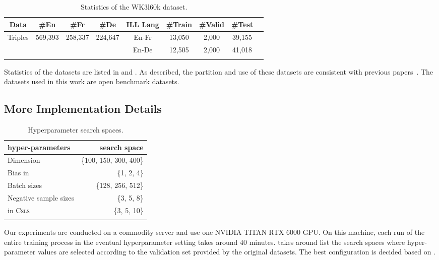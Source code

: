\documentclass[11pt,a4paper]{article}
\def\bhline{\specialrule{.2em}{0em}{0em}}
\begin{document}
{
\begin{table}[h!]
\setlength\tabcolsep{2pt}
\centering
\scriptsize
\begin{tabular}{c|ccc|c|cccc}
\bhline
Data&\#En&\#Fr&\#De&ILL Lang&\#Train&\#Valid&\#Test\\
\hline
\multirow{2}{*}{Triples}&\multirow{2}{*}{569,393}&\multirow{2}{*}{258,337}&\multirow{2}{*}{224,647}&En-Fr&13,050&2,000&39,155\\
&&&&En-De&12,505&2,000&41,018\\
\bhline
\end{tabular}
\caption{Statistics of the WK3l60k dataset.}\label{tbl:statwk}
\end{table}
}


Statistics of the datasets are listed in  and .
As described, the partition and use of these datasets are consistent with previous papers~\cite{chen2018co,sun2017cross,sun2018bootstrapping,wang2018cross,yang2019aligning,pei2019transport}. The datasets used in this work are open benchmark datasets. 






\subsection{More Implementation Details}\label{sup:hyper}

\begin{table}[h] \small
\setlength{\tabcolsep}{1pt}
\caption{Hyperparameter search spaces.}
\label{tbl:search_space}
\centering
\begin{tabular}{lr}
\bhline
hyper-parameters & search space \\
\hline
Dimension  & \{100, 150, 300, 400\}\\
Bias  in  & \{1, 2, 4\} \\
Batch sizes & \{128, 256, 512\} \\
Negative sample sizes & \{3, 5, 8\} \\
 in \textsc{Csls} & \{3, 5, 10\}\\
\bhline
\end{tabular}
\end{table}

Our experiments are conducted on a commodity server and use one NVIDIA TITAN RTX 6000 GPU.
On this machine,
each run of the entire training process in the eventual hyperparameter setting takes around 40 minutes.
 takes around list the search spaces where hyper-parameter values are selected according to the validation set provided by the original datasets.
The best configuration is decided based on .



 
\end{document}
